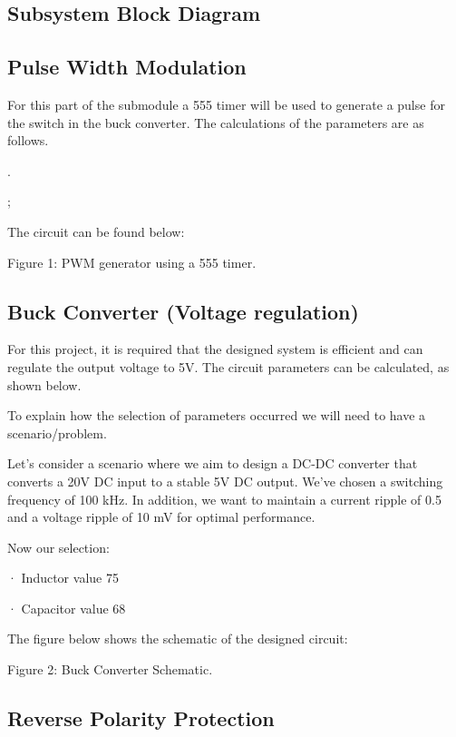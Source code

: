 \documentclass[class=report,11pt,crop=false]{standalone}
\begin{document}
\subsection{Subsystem Block Diagram}

 

\subsection{Pulse Width Modulation}

For this part of the submodule a 555 timer will be used to generate a pulse for the switch in the buck converter. The calculations of the parameters are as follows.

.

;  

The circuit can be found below:

Figure 1: PWM generator using a 555 timer.

\subsection{Buck Converter (Voltage regulation)}

For this project, it is required that the designed system is efficient and can regulate the output voltage to 5V. The circuit parameters can be calculated, as shown below.

To explain how the selection of parameters occurred we will need to have a scenario/problem. 

Let's consider a scenario where we aim to design a DC-DC converter that converts a 20V DC input to a stable 5V DC output. We've chosen a switching frequency of 100 kHz. In addition, we want to maintain a current ripple of 0.5 and a voltage ripple of 10 mV for optimal performance.

 

 

 

 

 

 

 Now our selection:

· Inductor value 75 

· Capacitor value 68 

The figure below shows the schematic of the designed circuit:

Figure 2: Buck Converter Schematic.

\subsection{Reverse Polarity Protection}
\end{document}
